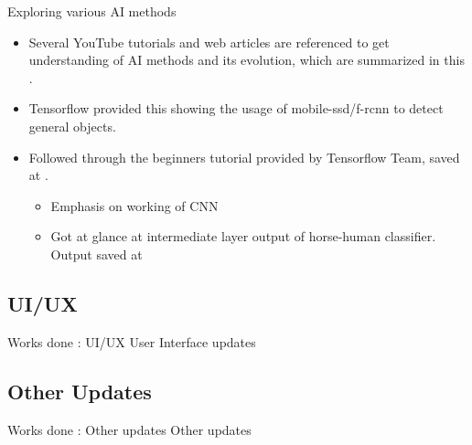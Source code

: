 \documentclass{beamer}
\newcommand{\link}[2]{\href{#1}{\textit{\color{blue}{#2}}}}%
\begin{document}
	\begin{frame}{Exploring various AI methods}
	\begin{itemize}
		\item Several YouTube tutorials and web articles are referenced to get understanding of AI methods and its evolution, which are summarized in this \link{https://docs.google.com/presentation/d/1ugCdqNADQ1QNd91lMP4BmbFBKYhkMoDrN2yIf\_t7SkI/edit?usp=sharing}{google slides}.
		
		\item Tensorflow provided this \link{https://github.com/Project-Dragon-Fly/tutorial-trials/blob/tutorial\_testing/object\_detection\_tensorflow\_tutorial.ipynb}{notebook} showing the usage of mobile-ssd/f-rcnn to detect general objects.
		
		\item Followed through the beginners tutorial provided by Tensorflow Team, saved at \link{https://github.com/Project-Dragon-Fly/tutorial-trials/tree/tutorial\_testing/YouTube\%20Tutorial\%20-\%20TensorFlow}{github}.
		\begin{itemize}
			\item Emphasis on working of CNN
			\item Got at glance at intermediate layer output of horse-human classifier. Output saved at  \link{https://github.com/Project-Dragon-Fly/tutorial-trials/blob/tutorial\_testing/YouTube\%20Tutorial\%20-\%20TensorFlow/Tutorial\%204\%20-\%20CNN\%20on\%20complex\%20images.ipynb}{notebook}
		\end{itemize}
	\end{itemize}
\end{frame}

	\subsection{UI/UX}	
	\begin{frame}{Works done : UI/UX}
		User Interface updates
	\end{frame}

	\subsection{Other Updates}
	\begin{frame}{Works done : Other updates}
		Other updates
	\end{frame}
\end{document}
